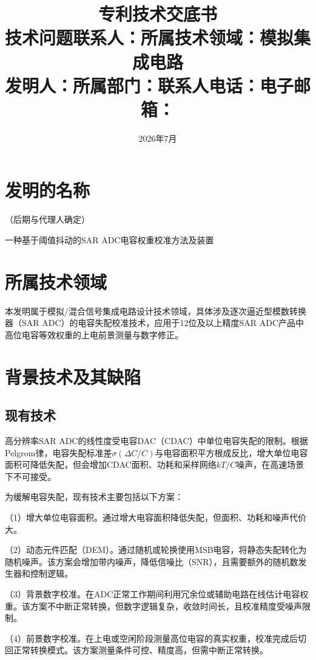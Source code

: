 \documentclass[UTF8,a4paper,11pt]{ctexart}
\title{\textbf{专利技术交底书}\\[6pt]
\large 技术问题联系人：\quad 所属技术领域：模拟集成电路\\
发明人：\quad 所属部门：\quad 联系人电话：\quad 电子邮箱：}
\author{}
\date{2026年7月}
\begin{document}
\maketitle

\tableofcontents
\newpage

\section{发明的名称}

（后期与代理人确定）

一种基于阈值抖动的SAR ADC电容权重校准方法及装置

\section{所属技术领域}

本发明属于模拟/混合信号集成电路设计技术领域，具体涉及逐次逼近型模数转换器（SAR ADC）的电容失配校准技术，应用于12位及以上精度SAR ADC产品中高位电容等效权重的上电前景测量与数字修正。

\section{背景技术及其缺陷}

\subsection{现有技术}

高分辨率SAR ADC的线性度受电容DAC（CDAC）中单位电容失配的限制。根据Pelgrom律，电容失配标准差$\sigma(\Delta C/C)$与电容面积平方根成反比，增大单位电容面积可降低失配，但会增加CDAC面积、功耗和采样网络$kT/C$噪声，在高速场景下不可接受。

为缓解电容失配，现有技术主要包括以下方案：

（1）增大单位电容面积。通过增大电容面积降低失配，但面积、功耗和噪声代价大。

（2）动态元件匹配（DEM）。通过随机或轮换使用MSB电容，将静态失配转化为随机噪声。该方案会增加带内噪声，降低信噪比（SNR），且需要额外的随机数发生器和控制逻辑。

（3）背景数字校准。在ADC正常工作期间利用冗余位或辅助电路在线估计电容权重。该方案不中断正常转换，但数字逻辑复杂，收敛时间长，且校准精度受噪声限制。

（4）前景数字校准。在上电或空闲阶段测量高位电容的真实权重，校准完成后切回正常转换模式。该方案测量条件可控、精度高，但需中断正常转换。
\end{document}
